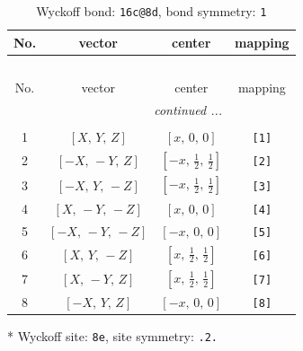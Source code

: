 \documentclass[fleqn,8pt]{jsarticle}
\begin{document}
\begin{longtable}{cccc}
\caption{Wyckoff bond: {\tt 16c@8d}, bond symmetry: {\tt 1}}
 \\
 \hline \hline
No. & vector & center & mapping \\ \hline \endfirsthead

\multicolumn{3}{l}{\tablename\ \thetable{}} \\
 \hline \hline
No. & vector & center & mapping \\ \hline \endhead

 \hline \hline
\multicolumn{3}{r}{\footnotesize\it continued ...} \\ \endfoot

 \hline \hline
\multicolumn{3}{r}{} \\ \endlastfoot

1 & $\left[ X,\, Y,\, Z \right]$ & $\left[ x,\, 0,\, 0 \right]$ & {\tt [1]} \\ \hline
2 & $\left[ - X,\, - Y,\, Z \right]$ & $\left[ - x,\, \frac{1}{2},\, \frac{1}{2} \right]$ & {\tt [2]} \\ \hline
3 & $\left[ - X,\, Y,\, - Z \right]$ & $\left[ - x,\, \frac{1}{2},\, \frac{1}{2} \right]$ & {\tt [3]} \\ \hline
4 & $\left[ X,\, - Y,\, - Z \right]$ & $\left[ x,\, 0,\, 0 \right]$ & {\tt [4]} \\ \hline
5 & $\left[ - X,\, - Y,\, - Z \right]$ & $\left[ - x,\, 0,\, 0 \right]$ & {\tt [5]} \\ \hline
6 & $\left[ X,\, Y,\, - Z \right]$ & $\left[ x,\, \frac{1}{2},\, \frac{1}{2} \right]$ & {\tt [6]} \\ \hline
7 & $\left[ X,\, - Y,\, Z \right]$ & $\left[ x,\, \frac{1}{2},\, \frac{1}{2} \right]$ & {\tt [7]} \\ \hline
8 & $\left[ - X,\, Y,\, Z \right]$ & $\left[ - x,\, 0,\, 0 \right]$ & {\tt [8]} \\
\end{longtable}
* Wyckoff site: {\tt 8e}, site symmetry: {\tt .2.}
\renewcommand{\arraystretch}{1.2}
\end{document}
